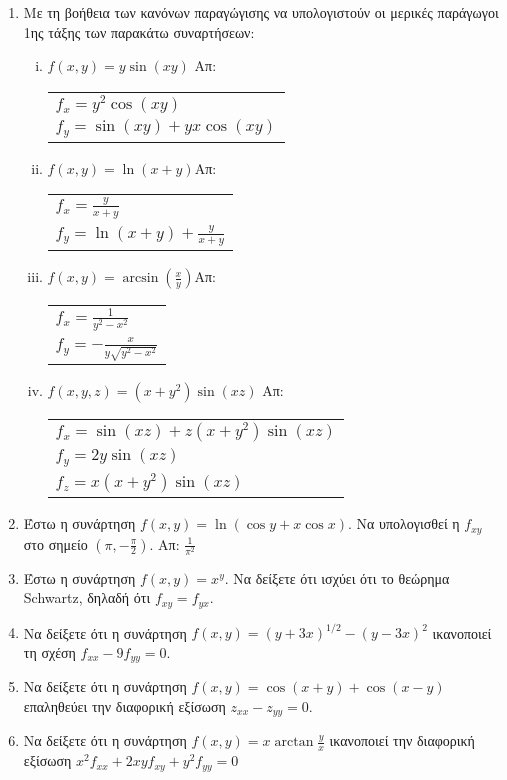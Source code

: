 \begin{enumerate}
    \item Με τη βοήθεια των κανόνων παραγώγισης να υπολογιστούν οι μερικές 
        παράγωγοι 1ης τάξης των παρακάτω συναρτήσεων:

        \begin{enumerate}[i)]
            \item $f(x,y)=y\sin (xy)$ \hfill Απ: \begin{tabular}{l}
                    $f_x=y^2\cos(xy)$ \\ 
                    $f_y=\sin(xy)+yx\cos(xy)$
                \end{tabular}

            \item $f(x,y)=\ln(x+y)$\hfill Απ: \begin{tabular}{l}
                    $f_x=\frac{y}{x+y}$ \\ 
                    $f_y=\ln(x+y)+\frac{y}{x+y}$
                \end{tabular}

            \item $f(x,y)=\arcsin(\frac{x}{y})$\hfill Απ: \begin{tabular}{l}
                    $f_x=\frac{1}{y^2-x^2}$ \\ 
                    $f_y=-\frac{x}{y\sqrt{y^2-x^2}}$
                \end{tabular}
            \item $ f(x,y,z) = (x+y^{2}) \sin{(xz)} $ \hfill Απ: \begin{tabular}{l}
                    $ f_{x} = \sin{(xz)} + z(x+y^{2}) \sin{(xz)} $ \\
                    $ f_{y} = 2y \sin{(xz)} $ \\
                    $ f_{z} = x(x+y^{2}) \sin{(xz)} $
                \end{tabular} 
        \end{enumerate}

    \item Έστω η συνάρτηση $f(x,y)=\ln\left(\cos y+x\cos x\right)$.  Να υπολογισθεί 
        η $ f_{xy} $ στο σημείο $\left(\pi,-\frac{\pi}{2}\right)$.
        \hfill Απ: $\frac{1}{\pi^2}$

    \item Έστω η συνάρτηση $ f(x,y) = x^{y} $. Να δείξετε ότι ισχύει ότι το θεώρημα 
        Schwartz, δηλαδή ότι $ f_{xy} = f_{yx} $.
    \item Να δείξετε ότι η συνάρτηση $ f(x,y) = (y+3x)^{1/2} - 
        (y-3x)^{2} $ ικανοποιεί τη σχέση $ f_{xx} - 9 f_{yy} = 0 $.
    \item Να δείξετε ότι η συνάρτηση $ f(x,y) = \cos{(x+y)} + \cos{(x-y)} $ 
        επαληθεύει την διαφορική εξίσωση $ z_{xx} - z_{yy} = 0 $.

    \item Να δείξετε ότι η συνάρτηση $ f(x,y) = x \arctan{\frac{y}{x}} $ 
        ικανοποιεί την διαφορική εξίσωση $ x^{2} f_{xx} + 2xyf_{xy} + y^{2} f_{yy} = 0 $ 
\end{enumerate}

